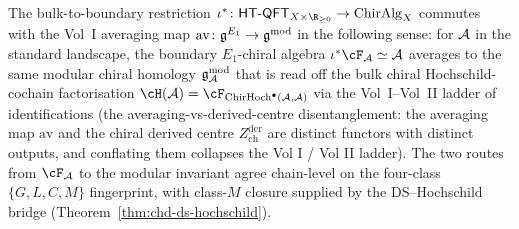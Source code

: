 \begin{remark}
\label{rem:bulk-bdry-vol1-averaging}%
The bulk-to-boundary restriction
$\iota^* \colon \HTQFT_{X \times \R_{\geq 0}} \to
\mathrm{ChirAlg}_X$ commutes with the Vol~I averaging map
$\mathrm{av} \colon \mathfrak{g}^{E_1} \to \mathfrak{g}^{\mathrm{mod}}$ in the
following sense: for $\mathcal{A}$ in the standard landscape, the
boundary $E_1$-chiral algebra
$\iota^*\cF_\cA \simeq \cA$ averages to the same modular
chiral homology $\mathfrak{g}^{\mathrm{mod}}_{\mathcal{A}}$ that is read off the
bulk chiral Hochschild-cochain factorisation $\cH(\cA) =
\cF_{\ChirHoch^\bullet(\cA,\cA)}$ via the
Vol~I--Vol~II ladder of identifications
(the averaging-vs-derived-centre disentanglement: the averaging
map $\mathrm{av}$ and the chiral derived centre $Z^{\mathrm{der}}_{\mathrm{ch}}$
are distinct functors with distinct outputs, and conflating them
collapses the Vol I / Vol II ladder). The
two routes from $\cF_\cA$ to the modular invariant agree
chain-level on the four-class $\{G, L, C, M\}$
fingerprint, with class-$M$ closure supplied by the
DS--Hochschild bridge
(Theorem~\ref*{thm:chd-ds-hochschild}).
\end{remark}

